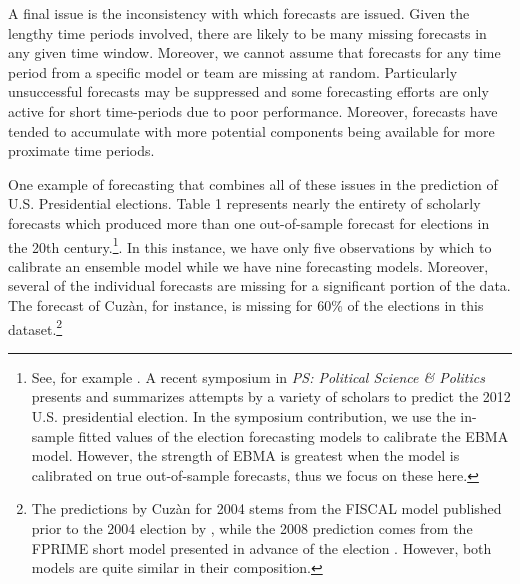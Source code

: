 \documentclass[12pt,fullpage,endnotes]{article}
\begin{document}
A final issue is the inconsistency with which forecasts are
issued. Given the lengthy time periods involved, there are likely to
be many missing forecasts in any given time window.  Moreover, we
cannot assume that forecasts for any time period from a specific model
or team are missing at random.  Particularly unsuccessful forecasts
may be suppressed and some forecasting efforts are only active for
short time-periods due to poor performance.  Moreover, forecasts have
tended to accumulate with more potential components being available
for more proximate time periods.

One example of forecasting that combines all of these issues in the
prediction of U.S. Presidential elections.  Table 1 represents nearly
the entirety of scholarly forecasts which produced more than one
out-of-sample forecast for elections in the 20th century.\footnote{
  See, for example \citet[][]{Fair:2009, Fair2011, Abramowitz:2008,
    Campbell:2008, hibbs:2012, Lockerbie:2008, Erikson:Wlezien:2008,
    Graefe:2010, Holbrook:2008}.  A recent symposium in {\em PS:
    Political Science \& Politics} presents and summarizes attempts by
  a variety of scholars to predict the 2012 U.S. presidential
  election. In the symposium contribution, we use the in-sample fitted
  values of the election forecasting models to calibrate the EBMA
  model. However, the strength of EBMA is greatest when the model is
  calibrated on true out-of-sample forecasts, thus we focus on these
  here.}.  In this instance, we have only five observations by which
to calibrate an ensemble model while we have nine forecasting models.
Moreover, several of the individual forecasts are missing for a
significant portion of the data.  The forecast of Cuz\`an, for
instance, is missing for 60\% of the elections in this
dataset.\footnote{The predictions by Cuz\`an for 2004 stems from the
  FISCAL model published prior to the 2004 election by
  \citet{Cuzan:2004}, while the 2008 prediction comes from the FPRIME
  short model presented in advance of the election
  \citep{Cuzan:Bundrick:2008}. However, both models are quite similar
  in their composition.}
\end{document}
